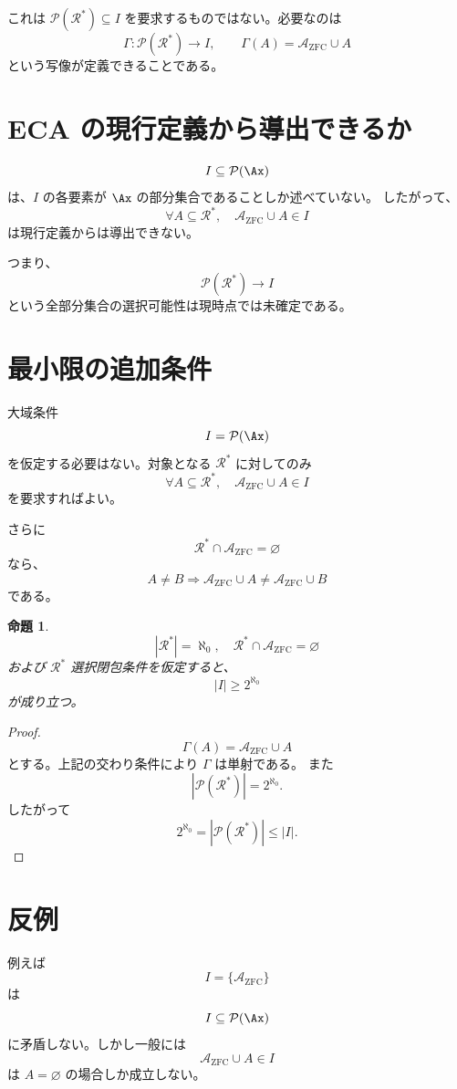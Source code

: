 \documentclass[a4paper,11pt]{ltjsarticle}
\newtheorem{proposition}{命題}
\begin{document}
これは
$\mathcal{P}(\mathcal{R}^*)\subseteq I$
を要求するものではない。必要なのは
\[
\Gamma:\mathcal{P}(\mathcal{R}^*)\to I,
\qquad
\Gamma(A)=\mathcal{A}_{\mathrm{ZFC}}\cup A
\]
という写像が定義できることである。

\section{ECA の現行定義から導出できるか}
\[
I\subseteq\mathcal{P}(\Ax)
\]
は、$I$ の各要素が $\Ax$ の部分集合であることしか述べていない。
したがって、
\[
\forall A\subseteq\mathcal{R}^*,
\quad
\mathcal{A}_{\mathrm{ZFC}}\cup A\in I
\]
は現行定義からは導出できない。

つまり、
\[
\mathcal{P}(\mathcal{R}^*)\longrightarrow I
\]
という全部分集合の選択可能性は現時点では未確定である。

\section{最小限の追加条件}
大域条件
\[
I=\mathcal{P}(\Ax)
\]
を仮定する必要はない。対象となる $\mathcal{R}^*$ に対してのみ
\[
\forall A\subseteq\mathcal{R}^*,
\quad
\mathcal{A}_{\mathrm{ZFC}}\cup A\in I
\]
を要求すればよい。

さらに
\[
\mathcal{R}^*\cap\mathcal{A}_{\mathrm{ZFC}}=\varnothing
\]
なら、
\[
A\neq B\Longrightarrow
\mathcal{A}_{\mathrm{ZFC}}\cup A\neq
\mathcal{A}_{\mathrm{ZFC}}\cup B
\]
である。

\begin{proposition}
\[
|\mathcal{R}^*|=\aleph_0,
\quad
\mathcal{R}^*\cap\mathcal{A}_{\mathrm{ZFC}}=\varnothing
\]
および $\mathcal{R}^*$ 選択閉包条件を仮定すると、
\[
\boxed{|I|\ge2^{\aleph_0}}
\]
が成り立つ。
\end{proposition}

\begin{proof}
\[
\Gamma(A)=\mathcal{A}_{\mathrm{ZFC}}\cup A
\]
とする。上記の交わり条件により $\Gamma$ は単射である。
また
\[
|\mathcal{P}(\mathcal{R}^*)|
=2^{\aleph_0}.
\]
したがって
\[
2^{\aleph_0}
=
|\mathcal{P}(\mathcal{R}^*)|
\le |I|.
\]
\end{proof}

\section{反例}
例えば
\[
I=\{\mathcal{A}_{\mathrm{ZFC}}\}
\]
は
\[
I\subseteq\mathcal{P}(\Ax)
\]
に矛盾しない。しかし一般には
\[
\mathcal{A}_{\mathrm{ZFC}}\cup A\in I
\]
は $A=\varnothing$ の場合しか成立しない。
\end{document}
